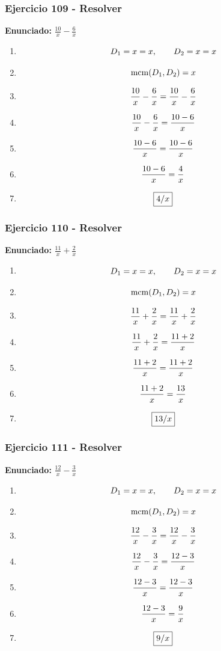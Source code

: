 \documentclass[11pt,a4paper]{article}
\newcommand{\fitmath}[1]{%
\[
\setbox0=\hbox{$\displaystyle #1$}%
\ifdim\wd0>\linewidth
\resizebox{\linewidth}{!}{$\displaystyle #1$}%
\else
#1%
\fi
\]
}
\begin{document}
\subsubsection*{Ejercicio 109 - Resolver}
\textbf{Enunciado:} $ \frac{10}{x} - \frac{6}{x} $\par
\begin{enumerate}[leftmargin=2em]
\item \fitmath{D_1=x=x,\qquad D_2=x=x}
\item \fitmath{\operatorname{mcm}(D_1,D_2)=x}
\item \fitmath{\frac{10}{x} - \frac{6}{x}= \frac{10}{x} - \frac{6}{x}}
\item \fitmath{\frac{10}{x} - \frac{6}{x}=\frac{10 - 6}{x}}
\item \fitmath{\frac{10 - 6}{x}=\frac{10 - 6}{x}}
\item \fitmath{\frac{10 - 6}{x}=\frac{4}{x}}
\item \fitmath{\boxed{4 / x}}
\end{enumerate}

\vspace{0.12cm}
\subsubsection*{Ejercicio 110 - Resolver}
\textbf{Enunciado:} $ \frac{11}{x} + \frac{2}{x} $\par
\begin{enumerate}[leftmargin=2em]
\item \fitmath{D_1=x=x,\qquad D_2=x=x}
\item \fitmath{\operatorname{mcm}(D_1,D_2)=x}
\item \fitmath{\frac{11}{x} + \frac{2}{x}= \frac{11}{x} + \frac{2}{x}}
\item \fitmath{\frac{11}{x} + \frac{2}{x}=\frac{11 + 2}{x}}
\item \fitmath{\frac{11 + 2}{x}=\frac{11 + 2}{x}}
\item \fitmath{\frac{11 + 2}{x}=\frac{13}{x}}
\item \fitmath{\boxed{13 / x}}
\end{enumerate}

\vspace{0.12cm}
\subsubsection*{Ejercicio 111 - Resolver}
\textbf{Enunciado:} $ \frac{12}{x} - \frac{3}{x} $\par
\begin{enumerate}[leftmargin=2em]
\item \fitmath{D_1=x=x,\qquad D_2=x=x}
\item \fitmath{\operatorname{mcm}(D_1,D_2)=x}
\item \fitmath{\frac{12}{x} - \frac{3}{x}= \frac{12}{x} - \frac{3}{x}}
\item \fitmath{\frac{12}{x} - \frac{3}{x}=\frac{12 - 3}{x}}
\item \fitmath{\frac{12 - 3}{x}=\frac{12 - 3}{x}}
\item \fitmath{\frac{12 - 3}{x}=\frac{9}{x}}
\item \fitmath{\boxed{9 / x}}
\end{enumerate}
\end{document}
